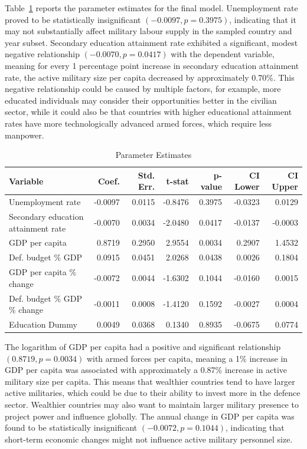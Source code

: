 Table~\ref{tab:final_model} reports the parameter estimates for the final model. 
Unemployment rate proved to be statistically insignificant $(-0.0097, p=0.3975)$, 
indicating that it may not substantially affect military labour supply in the sampled country and year subset.
Secondary education attainment rate exhibited a significant, modest negative relationship $(-0.0070, p=0.0417)$ 
with the dependent variable, meaning for every 1 percentage point increase in secondary education 
attainment rate, the active military size per capita decreased by approximately 0.70\%.
This negative relationship could be caused by multiple factors, for example, more educated individuals 
may consider their opportunities better in the civilian sector, while it could also be that countries 
with higher educational attainment rates have more technologically advanced armed forces, which require 
less manpower.

\begin{table}[htbp]
\caption{Parameter Estimates}
\centering
\begin{threeparttable}
\begin{tabularx}{\textwidth}{@{}Xrrrrrr@{}}
\toprule
\textbf{Variable} & \textbf{Coef.} & \textbf{Std. Err.} & \textbf{t-stat} & \textbf{p-value} & \textbf{CI Lower} & \textbf{CI Upper} \\
\midrule
Unemployment rate & -0.0097 & 0.0115 & -0.8476 & 0.3975 & -0.0323 & 0.0129 \\
Secondary education attainment rate & -0.0070 & 0.0034 & -2.0480 & 0.0417 & -0.0137 & -0.0003 \\
GDP per capita & 0.8719 & 0.2950 & 2.9554 & 0.0034 & 0.2907 & 1.4532 \\
Def. budget \% GDP & 0.0915 & 0.0451 & 2.0268 & 0.0438 & 0.0026 & 0.1804 \\
GDP per capita \% change & -0.0072 & 0.0044 & -1.6302 & 0.1044 & -0.0160 & 0.0015 \\
Def. budget \% GDP \% change & -0.0011 & 0.0008 & -1.4120 & 0.1592 & -0.0027 & 0.0004 \\
Education Dummy & 0.0049 & 0.0368 & 0.1340 & 0.8935 & -0.0675 & 0.0774 \\
\bottomrule
\end{tabularx}
\end{threeparttable}
\label{tab:final_model}
\end{table}

The logarithm of GDP per capita had a positive and significant relationship $(0.8719, p=0.0034)$ 
with armed forces per capita, meaning a 1\% increase in GDP per capita was associated with 
approximately a 0.87\% increase in active military size per capita. 
This means that wealthier countries tend to have larger active militaries, which could 
be due to their ability to invest more in the defence sector. Wealthier countries may also 
want to maintain larger military presence to project power and influence globally.
The annual change in GDP per capita was found to be 
statistically insignificant $(-0.0072, p=0.1044)$,
indicating that short-term economic changes might not influence active military personnel size. 

